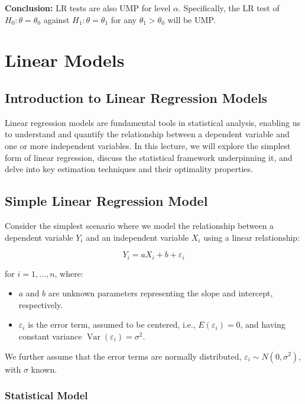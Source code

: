 \documentclass[open=any, 11pt,paper=A4]{scrreprt}
\begin{document}
\textbf{Conclusion:} LR tests are also UMP for level \( \alpha \). Specifically, the LR test of \( H_0: \theta = \theta_0 \) against \( H_1: \theta = \theta_1 \) for any \( \theta_1 > \theta_0 \) will be UMP.

\chapter{Linear Models}

\section{Introduction to Linear Regression Models}

Linear regression models are fundamental tools in statistical analysis, enabling us to understand and quantify the relationship between a dependent variable and one or more independent variables. In this lecture, we will explore the simplest form of linear regression, discuss the statistical framework underpinning it, and delve into key estimation techniques and their optimality properties.

\section{Simple Linear Regression Model}

Consider the simplest scenario where we model the relationship between a dependent variable \( Y_i \) and an independent variable \( X_i \) using a linear relationship:

\begin{equation}
    Y_i = aX_i + b + \varepsilon_i
    \label{eq:simple_linear_model}
\end{equation}

for \( i = 1, \ldots, n \), where:
\begin{itemize}
    \item \( a \) and \( b \) are unknown parameters representing the slope and intercept, respectively.
    \item \( \varepsilon_i \) is the error term, assumed to be centered, i.e., \( E(\varepsilon_i) = 0 \), and having constant variance \( \operatorname{Var}(\varepsilon_i) = \sigma^2 \).
\end{itemize}

We further assume that the error terms are normally distributed, \( \varepsilon_i \sim N(0, \sigma^2) \), with \( \sigma \) known.

\subsection{Statistical Model}
\end{document}
